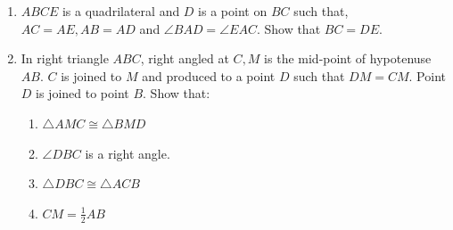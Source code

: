 \begin{enumerate}[label=\arabic*.,ref=\thesubsection.\theenumi]
\item $ABCE$ is a quadrilateral and $D$ is a point on $BC$ such that, $AC = AE, AB = AD$ and $\angle  BAD = \angle  EAC$. Show that $BC = DE$.
%
\item In right triangle $ABC$, right angled at $C, M$ is the mid-point of hypotenuse $AB$. $C$ is joined to $M$ and produced to a point $D$ such that $DM = CM$. Point $D$ is joined to point $B$.
Show that: 
\begin{enumerate}
\item $ \triangle  AMC \cong  \triangle  BMD $
\item $\angle  DBC$ is a right angle. 
\item $\triangle  DBC \cong  \triangle  ACB$
\item $ CM = \frac{1}{ 2} AB$
\end{enumerate}
%

\end{enumerate}
